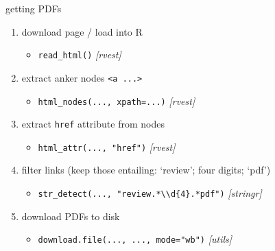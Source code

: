 \documentclass[ignorenonframetext,]{beamer}
\providecommand{\tightlist}{%
  \setlength{\itemsep}{0pt}\setlength{\parskip}{0pt}}
\begin{document}
\begin{frame}[fragile]{getting PDFs}

\begin{enumerate}
\def\labelenumi{\arabic{enumi})}
\tightlist
\item
  download page / load into R

  \begin{itemize}
  \tightlist
  \item
    \texttt{read\_html()} \emph{{[}rvest{]}}
  \end{itemize}
\item
  extract anker nodes \texttt{\textless{}a\ ...\textgreater{}}

  \begin{itemize}
  \tightlist
  \item
    \texttt{html\_nodes(...,\ xpath=...)} \emph{{[}rvest{]}}\\
  \end{itemize}
\item
  extract \texttt{href} attribute from nodes

  \begin{itemize}
  \tightlist
  \item
    \texttt{html\_attr(...,\ "href")} \emph{{[}rvest{]}}
  \end{itemize}
\item
  filter links (keep those entailing: `review'; four digits; `pdf')

  \begin{itemize}
  \tightlist
  \item
    \texttt{str\_detect(...,\ "review.*\textbackslash{}\textbackslash{}d\{4\}.*pdf")}
    \emph{{[}stringr{]}}
  \end{itemize}
\item
  download PDFs to disk

  \begin{itemize}
  \tightlist
  \item
    \texttt{download.file(...,\ ...,\ mode="wb")} \emph{{[}utils{]}}
  \end{itemize}
\end{enumerate}

\end{frame}
\end{document}
